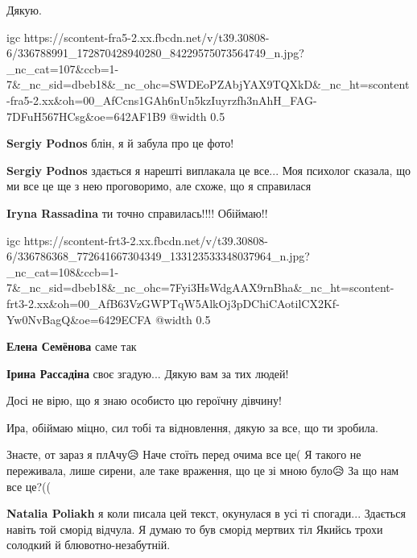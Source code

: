 Дякую.

\ifcmt
  igc https://scontent-fra5-2.xx.fbcdn.net/v/t39.30808-6/336788991_172870428940280_84229575073564749_n.jpg?_nc_cat=107&ccb=1-7&_nc_sid=dbeb18&_nc_ohc=SWDEoPZAbjYAX9TQXkD&_nc_ht=scontent-fra5-2.xx&oh=00_AfCcns1GAh6nUn5kzIuyrzfh3nAhH_FAG-7DFuH567HCsg&oe=642AF1B9
	@width 0.5
\fi

\begin{itemize} %
\textbf{Sergiy Podnos} блін, я й забула про це фото! 🌼

\textbf{Sergiy Podnos} здається я нарешті виплакала це все...
Моя психолог сказала, що ми все це ще з нею проговоримо, але схоже, що я справилася

\textbf{Iryna Rassadina} ти точно справилась!!!! Обіймаю!!
\end{itemize} %


\ifcmt
  igc https://scontent-frt3-2.xx.fbcdn.net/v/t39.30808-6/336786368_772641667304349_133123533348037964_n.jpg?_nc_cat=108&ccb=1-7&_nc_sid=dbeb18&_nc_ohc=7Fyi3HsWdgAAX9rnBha&_nc_ht=scontent-frt3-2.xx&oh=00_AfB63VzGWPTqW5AlkOj3pDChiCAotilCX2Kf-Yw0NvBagQ&oe=6429ECFA
	@width 0.5
\fi

\begin{itemize} %
\textbf{Елена Семёнова} саме так

\textbf{Ірина Рассадіна} своє згадую... Дякую вам за тих людей!
\end{itemize} %


Досі не вірю, що я знаю особисто цю героїчну дівчину!


Ира, обіймаю міцно, сил тобі та відновлення, дякую за все, що ти зробила.


Знаєте, от зараз я плАчу😥 Наче стоїть перед очима все це( Я такого не
переживала, лише сирени, але таке враження, що це зі мною було😥 За що нам все
це?((

\begin{itemize} %
\textbf{Natalia Poliakh} я коли писала цей текст, окунулася в усі ті спогади...
Здається навіть той сморід відчула.
Я думаю то був сморід мертвих тіл
Якийсь трохи солодкий й блювотно-незабутній.
\end{itemize} %

